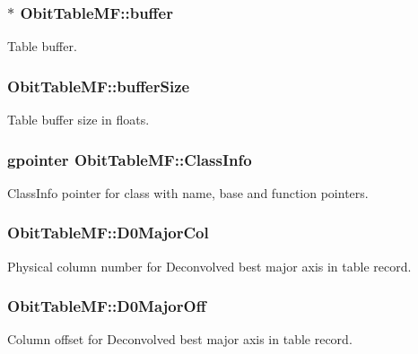 \subsubsection{$\ast$ {\bf Obit\-Table\-MF::buffer}}\label{structObitTableMF_o10}


Table buffer. 

\subsubsection{ {\bf Obit\-Table\-MF::buffer\-Size}}\label{structObitTableMF_o11}


Table buffer size in floats. 

\subsubsection{\setlength{\rightskip}{0pt plus 5cm}gpointer {\bf Obit\-Table\-MF::Class\-Info}}\label{structObitTableMF_o1}


Class\-Info pointer for class with name, base and function pointers. 

\subsubsection{ {\bf Obit\-Table\-MF::D0Major\-Col}}\label{structObitTableMF_o65}


Physical column number for Deconvolved best major axis in table record. 

\subsubsection{ {\bf Obit\-Table\-MF::D0Major\-Off}}\label{structObitTableMF_o64}


Column offset for Deconvolved best major axis in table record. 

